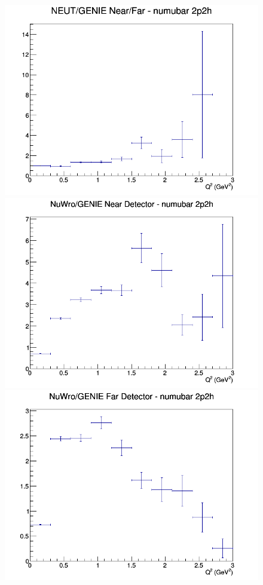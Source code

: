 \begin{figure}[h]
\endminipage
{}
\includegraphics[width=\linewidth]{eff_Q2/GAr/ratios/2p2h_NEUT_GENIE_numubar_NF_Q2.png}
\endminipage
\newline
{}
\includegraphics[width=\linewidth]{eff_Q2/GAr/ratios/2p2h_NuWro_GENIE_numubar_near_Q2.png}
\endminipage
{}
\includegraphics[width=\linewidth]{eff_Q2/GAr/ratios/2p2h_NuWro_GENIE_numubar_far_Q2.png}

\end{figure}
